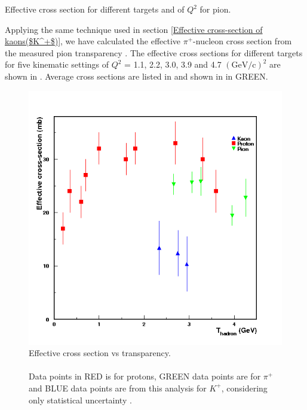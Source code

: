 
\begin{table}
  \caption[Effective cross section for different targets and of $Q^2$ for pion.]{\label{tab:eff_cr3}Effective cross section for different targets and of $Q^2$ for pion.}

\end{table}

%
Applying the same technique used in section \ref{Effective cross-section of kaons($K^+$)}, we have calculated the effective $\pi^+$-nucleon cross section from the measured pion transparency \cite{BC06}. The effective cross sections for different targets for five kinematic settings of $Q^2$ = 1.1, 2.2, 3.0, 3.9 and 4.7 $(\mathrm{GeV/c})^2$ are shown in . Average cross sections are listed in  and shown in  in GREEN.


\begin{figure}[!tbp]
  \centering
  \includegraphics[width=0.8\columnwidth]{eff_av_all}
  \caption[Effective cross section vs transparency.]{\label{fig:eff_av_all}Effective cross section vs transparency.\\\\ Data points in RED is for protons, GREEN data points are for $\pi^+$ and BLUE data points are from this analysis for $K^+$, considering only statistical uncertainty \cite{hinton01}.}
\end{figure}

